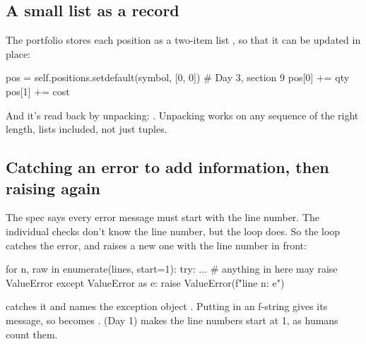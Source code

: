 \documentclass[10pt,a4paper]{article}
\begin{document}
\subsection{A small list as a record}
The portfolio stores each position as a two-item list , so that it can be updated in place:
\begin{pycode}
pos = self.positions.setdefault(symbol, [0, 0])   # Day 3, section 9
pos[0] += qty
pos[1] += cost
\end{pycode}
And it’s read back by unpacking: . Unpacking works on any sequence of the right length, lists included, not just tuples.
\subsection{Catching an error to add information, then raising again}
The spec says every error message must start with the line number. The individual checks don’t know the line number, but the loop does. So the loop catches the error, and raises a new one with the line number in front:
\begin{pycode}
for n, raw in enumerate(lines, start=1):
    try:
        ...                                   # anything in here may raise ValueError
    except ValueError as e:
        raise ValueError(f"line {n}: {e}")
\end{pycode}
 catches it and names the exception object . Putting  in an f-string gives its message, so  becomes .  (Day 1) makes the line numbers start at 1, as humans count them.
\end{document}
